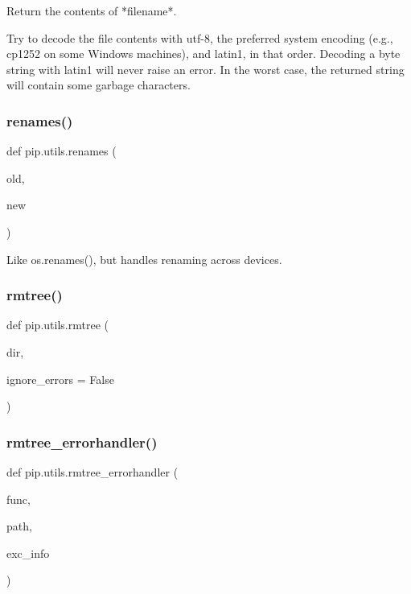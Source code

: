 \begin{DoxyVerb}Return the contents of *filename*.

Try to decode the file contents with utf-8, the preferred system encoding
(e.g., cp1252 on some Windows machines), and latin1, in that order.
Decoding a byte string with latin1 will never raise an error. In the worst
case, the returned string will contain some garbage characters.\end{DoxyVerb}
 \mbox{\label{namespacepip_1_1utils_a4bf83ce3cebda670755566883f68e02b}} 
\subsubsection{\texorpdfstring{renames()}{renames()}}
{\footnotesize\ttfamily def pip.\+utils.\+renames (\begin{DoxyParamCaption}\item[{}]{old,  }\item[{}]{new }\end{DoxyParamCaption})}

\begin{DoxyVerb}Like os.renames(), but handles renaming across devices.\end{DoxyVerb}
 \mbox{\label{namespacepip_1_1utils_aa8ffe550e48870fe8cd5597b73aeb940}} 
\subsubsection{\texorpdfstring{rmtree()}{rmtree()}}
{\footnotesize\ttfamily def pip.\+utils.\+rmtree (\begin{DoxyParamCaption}\item[{}]{dir,  }\item[{}]{ignore\+\_\+errors = {\ttfamily False} }\end{DoxyParamCaption})}

\mbox{\label{namespacepip_1_1utils_a68d0b342e03305f7ed07f0aaf73da43a}} 
\subsubsection{\texorpdfstring{rmtree\+\_\+errorhandler()}{rmtree\_errorhandler()}}
{\footnotesize\ttfamily def pip.\+utils.\+rmtree\+\_\+errorhandler (\begin{DoxyParamCaption}\item[{}]{func,  }\item[{}]{path,  }\item[{}]{exc\+\_\+info }\end{DoxyParamCaption})}


